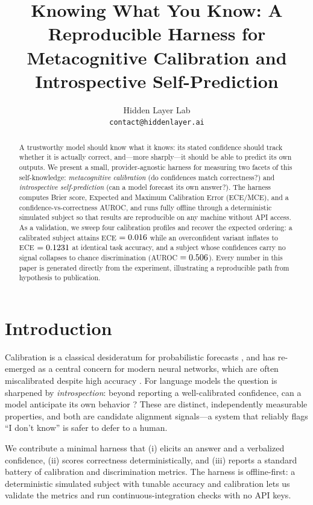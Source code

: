 \documentclass{article}
\title{Knowing What You Know: A Reproducible Harness for\\
Metacognitive Calibration and Introspective Self-Prediction}
\author{
  Hidden Layer Lab \\
  \texttt{contact@hiddenlayer.ai}
}
\date{}
\begin{document}
\maketitle

\begin{abstract}
A trustworthy model should know what it knows: its stated confidence should track
whether it is actually correct, and---more sharply---it should be able to predict its
own outputs. We present a small, provider-agnostic harness for measuring two facets of
this self-knowledge: \emph{metacognitive calibration} (do confidences match
correctness?) and \emph{introspective self-prediction} (can a model forecast its own
answer?). The harness computes Brier score, Expected and Maximum Calibration Error
(ECE/MCE), and a confidence-vs-correctness AUROC, and runs fully offline through a
deterministic simulated subject so that results are reproducible on any machine without
API access. As a validation, we sweep four calibration profiles and recover the expected
ordering: a calibrated subject attains ECE $=0.016$ while an overconfident
variant inflates to ECE $=0.1231$ at identical task accuracy, and a subject
whose confidences carry no signal collapses to chance discrimination
(AUROC $=0.506$). Every number in this paper is generated directly from the
experiment, illustrating a reproducible path from hypothesis to publication.
\end{abstract}

\section{Introduction}
Calibration is a classical desideratum for probabilistic forecasts \cite{brier1950}, and
has re-emerged as a central concern for modern neural networks, which are often
miscalibrated despite high accuracy \cite{guo2017}. For language models the question is
sharpened by \emph{introspection}: beyond reporting a well-calibrated confidence, can a
model anticipate its own behavior \cite{anthropic2025}? These are distinct,
independently measurable properties, and both are candidate alignment signals---a system
that reliably flags ``I don't know'' is safer to defer to a human.

We contribute a minimal harness that (i) elicits an answer and a verbalized confidence,
(ii) scores correctness deterministically, and (iii) reports a standard battery of
calibration and discrimination metrics. The harness is offline-first: a deterministic
simulated subject with tunable accuracy and calibration lets us validate the metrics and
run continuous-integration checks with no API keys.
\end{document}

